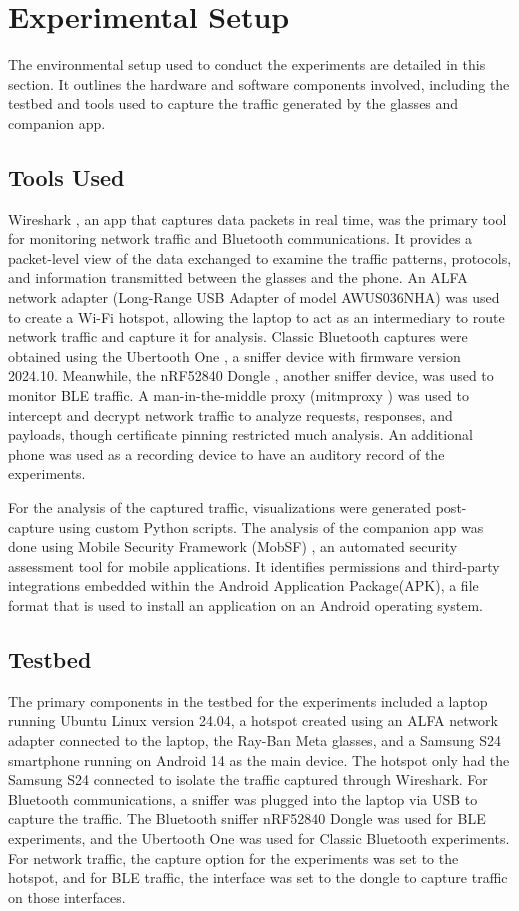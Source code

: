 \section{Experimental Setup}
The environmental setup used to conduct the experiments are detailed in this section. It outlines the hardware and software components involved, including the testbed and tools used to capture the traffic generated by the glasses and companion app.

\subsection*{Tools Used}
Wireshark \cite{Wireshark}, an app that captures data packets in real time, was the primary tool for monitoring network traffic and Bluetooth communications. It provides a packet-level view of the data exchanged to examine the traffic patterns, protocols, and information transmitted between the glasses and the phone. An ALFA network adapter (Long-Range USB Adapter of model AWUS036NHA) was used to create a Wi-Fi hotspot, allowing the laptop to act as an intermediary to route network traffic and capture it for analysis. Classic Bluetooth captures were obtained using the Ubertooth One \cite{UbertoothOne}, a sniffer device with firmware version 2024.10. Meanwhile, the nRF52840 Dongle \cite{nRF52840}, another sniffer device, was used to monitor BLE traffic. A man-in-the-middle proxy (mitmproxy \cite{mitmproxy}) was used to intercept and decrypt network traffic to analyze requests, responses, and payloads, though certificate pinning restricted much analysis. An additional phone was used as a recording device to have an auditory record of the experiments. 

For the analysis of the captured traffic, visualizations were generated post-capture using custom Python scripts. The analysis of the companion app was done using Mobile Security Framework (MobSF) \cite{MobSF}, an automated security assessment tool for mobile applications. It identifies permissions and third-party integrations embedded within the Android Application Package(APK), a file format that is used to install an application on an Android operating system.



\subsection*{Testbed}
The primary components in the testbed for the experiments included a laptop running Ubuntu Linux version 24.04, a hotspot created using an ALFA network adapter connected to the laptop, the Ray-Ban Meta glasses, and a Samsung S24 smartphone running on Android 14 as the main device. The hotspot only had the Samsung S24 connected to isolate the traffic captured through Wireshark. For Bluetooth communications, a sniffer was plugged into the laptop via USB to capture the traffic. The Bluetooth sniffer nRF52840 Dongle was used for BLE experiments, and the Ubertooth One was used for Classic Bluetooth experiments. For network traffic, the capture option for the experiments was set to the hotspot, and for BLE traffic, the interface was set to the dongle to capture traffic on those interfaces.

